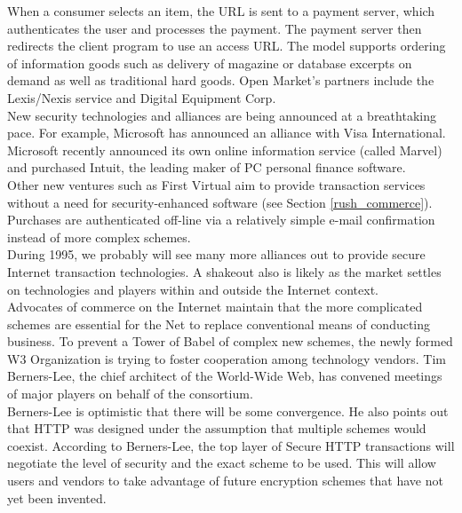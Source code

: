 When a consumer selects an item, the URL is sent to a payment server,
which authenticates the user and processes the payment. The payment
server then redirects the client program to use an access URL. The
model supports ordering of information goods such as delivery of
magazine or database excerpts on demand as well as traditional hard
goods. Open Market's partners include the Lexis/Nexis service and
Digital Equipment Corp.\\

New security technologies and alliances are being announced at a
breathtaking pace. For example, Microsoft has announced an alliance
with Visa International. Microsoft recently announced its own online
information service (called Marvel) and purchased Intuit, the leading
maker of PC personal finance software.\\

Other new ventures such as First Virtual aim to provide transaction
services without a need for security-enhanced software (see Section
\ref{rush_commerce}). Purchases are authenticated off-line via a relatively
simple e-mail confirmation instead of more complex schemes.\\

During 1995, we probably will see many more alliances out to provide
secure Internet transaction technologies. A shakeout also is likely as
the market settles on technologies and players within and outside the
Internet context.\\

Advocates of commerce on the Internet maintain that the more
complicated schemes are essential for the Net to replace conventional
means of conducting business. To prevent a Tower of Babel of complex
new schemes, the newly formed W3 Organization is trying to foster
cooperation among technology vendors. Tim Berners-Lee, the chief
architect of the World-Wide Web, has convened meetings of major players
on behalf of the consortium.\\

Berners-Lee is optimistic that there will be some convergence. He also
points out that HTTP was designed under the assumption that multiple
schemes would coexist. According to Berners-Lee, the top layer of
Secure HTTP transactions will negotiate the level of security and the
exact scheme to be used. This will allow users and vendors to take
advantage of future encryption schemes that have not yet been invented.

